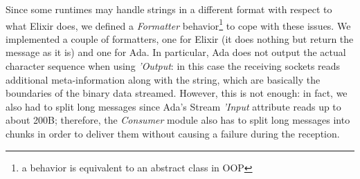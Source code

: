 
Since some runtimes may handle strings in a different format with respect to
what Elixir does, we defined a \textit{Formatter} behavior\footnote{a behavior
is equivalent to an abstract class in OOP} to cope with these
issues.
We implemented a couple of formatters, one for Elixir (it does nothing but
return the message as it is) and one for Ada. In particular, Ada does not
output the actual character sequence when using \textit{'Output}: in this case
the receiving sockets reads additional meta-information along with the string,
which are basically the boundaries of the binary data streamed.
However, this is not enough: in fact, we also had to split long messages since
Ada's Stream \textit{'Input} attribute reads up to about 200B; therefore, the
\textit{Consumer} module also has to split long messages into chunks in order
to deliver them without causing a failure during the reception.